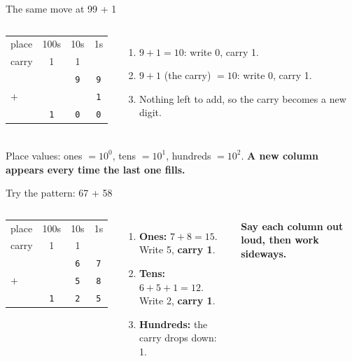 \documentclass[aspectratio=169,10pt]{beamer}
\newcommand{\gc}[1]{\textcolor{black!60}{\footnotesize #1}}
\begin{document}
\begin{frame}{The same move at 99 + 1}
\begin{columns}[c]
\begin{center}{\huge
\begin{tabular}{@{}l@{\ \ }c@{\ \ }c@{\ \ }c@{}}
\gc{place} & \gc{100s} & \gc{10s} & \gc{1s}\\
\gc{carry} & \gc{1} & \gc{1} & \\
 & & \texttt{9} & \texttt{9}\\
$+$ & & & \texttt{1}\\\hline
 & \texttt{1} & \texttt{0} & \texttt{0}
\end{tabular}}\end{center}
\begin{enumerate}
\item $9+1=10$: write 0, carry 1.
\item $9+1$ (the carry) $=10$: write 0, carry 1.
\item Nothing left to add, so the carry becomes a new digit.
\end{enumerate}
\end{columns}
\vspace{4pt}
Place values: ones $=10^0$, tens $=10^1$, hundreds $=10^2$. \textbf{A new column appears every time the last one fills.}
\end{frame}

\begin{frame}{Try the pattern: 67 + 58}
\begin{columns}[c]
\begin{center}{\huge
\begin{tabular}{@{}l@{\ \ }c@{\ \ }c@{\ \ }c@{}}
\gc{place} & \gc{100s} & \gc{10s} & \gc{1s}\\
\gc{carry} & \gc{1} & \gc{1} & \\
 &  & \texttt{6} & \texttt{7}\\
$+$ &  & \texttt{5} & \texttt{8}\\\hline
 & \texttt{1} & \texttt{2} & \texttt{5}
\end{tabular}}\end{center}
\begin{enumerate}
\item \textbf{Ones:} $7+8=15$. Write 5, \textbf{carry 1}.
\item \textbf{Tens:} $6+5+1=12$. Write 2, \textbf{carry 1}.
\item \textbf{Hundreds:} the carry drops down: 1.
\end{enumerate}
\textbf{Say each column out loud, then work sideways.}
\end{columns}
\end{frame}
\end{document}
